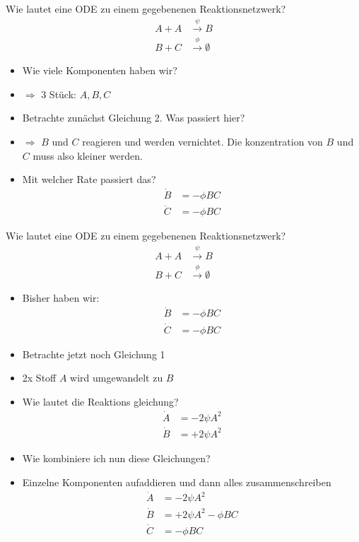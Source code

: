 \begin{frame}[fragile]
    Wie lautet eine ODE zu einem gegebenenen Reaktionsnetzwerk?
    \begin{align}
        A+A&\xrightarrow{\psi}B\\
        B+C&\xrightarrow{\phi}\emptyset
    \end{align}
    \begin{itemize}[<+->]
        \item Wie viele Komponenten haben wir?
        \item[ ] $\Rightarrow$ 3 Stück: $A, B, C$
        \item Betrachte zunächst Gleichung 2. Was passiert hier?
        \item[ ] $\Rightarrow$ $B$ und $C$ reagieren und werden vernichtet. 
        Die konzentration von $B$ und $C$ muss also kleiner werden.
        \item Mit welcher Rate passiert das?
        \pause \begin{align}
            \dot{B} &= -\phi BC\\
            \dot{C} &= -\phi BC
        \end{align}
    \end{itemize}
\end{frame}


\begin{frame}[fragile]
    Wie lautet eine ODE zu einem gegebenenen Reaktionsnetzwerk?
    \begin{align}
        A+A&\xrightarrow{\psi}B\\
        B+C&\xrightarrow{\phi}\emptyset
    \end{align}
    \begin{itemize}[<+->]
        \item Bisher haben wir:
        \pause \begin{align}
            \dot{B} &= -\phi BC\\
            \dot{C} &= -\phi BC
        \end{align}
        \item Betrachte jetzt noch Gleichung 1
        \item[ ] 2x Stoff $A$ wird umgewandelt zu $B$
        \item Wie lautet die Reaktions gleichung?
        \pause
        \begin{align}
            \dot{A} &= -2\psi A^2\\
            \dot{B} &= +2\psi A^2
        \end{align}
        \item Wie kombiniere ich nun diese Gleichungen?
        \item[ ] Einzelne Komponenten aufaddieren und dann alles zusammenschreiben
        \pause
        \begin{align}
            \dot{A} &= -2\psi A^2\\
            \dot{B} &= +2\psi A^2 -\phi BC\\
            \dot{C} &= -\phi BC
        \end{align}
    \end{itemize}
\end{frame}


